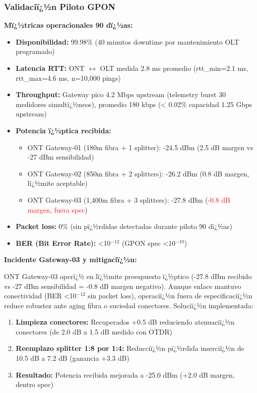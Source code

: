 \subsubsection{Validaciï¿½n Piloto GPON}

\textbf{Mï¿½tricas operacionales 90 dï¿½as:}

\begin{itemize}
    \item \textbf{Disponibilidad:} 99.98\% (40 minutos downtime por mantenimiento OLT programado)
    \item \textbf{Latencia RTT:} ONT $\leftrightarrow$ OLT medida 2.8 ms promedio (rtt\_min=2.1 ms, rtt\_max=4.6 ms, n=10,000 pings)
    \item \textbf{Throughput:} Gateway pico 4.2 Mbps upstream (telemetry burst 30 medidores simultï¿½neos), promedio 180 kbps (< 0.02\% capacidad 1.25 Gbps upstream)
    \item \textbf{Potencia ï¿½ptica recibida:} 
    \begin{itemize}
        \item ONT Gateway-01 (180m fibra + 1 splitter): -24.5 dBm (2.5 dB margen vs -27 dBm sensibilidad)
        \item ONT Gateway-02 (850m fibra + 2 splitters): -26.2 dBm (0.8 dB margen, lï¿½mite aceptable)
        \item ONT Gateway-03 (1,400m fibra + 3 splitters): -27.8 dBm (\textcolor{red}{-0.8 dB margen, fuera spec})
    \end{itemize}
    \item \textbf{Packet loss:} 0\% (sin pï¿½rdidas detectadas durante piloto 90 dï¿½as)
    \item \textbf{BER (Bit Error Rate):} <10$^{-12}$ (GPON spec <10$^{-10}$)
\end{itemize}

\textbf{Incidente Gateway-03 y mitigaciï¿½n:}

ONT Gateway-03 operï¿½ en lï¿½mite presupuesto ï¿½ptico (-27.8 dBm recibido vs -27 dBm sensibilidad = -0.8 dB margen negativo). Aunque enlace mantuvo conectividad (BER <10$^{-12}$ sin packet loss), operaciï¿½n fuera de especificaciï¿½n reduce robustez ante aging fibra o suciedad conectores. Soluciï¿½n implementada:

\begin{enumerate}
    \item \textbf{Limpieza conectores:} Recuperados +0.5 dB reduciendo atenuaciï¿½n conectores (de 2.0 dB a 1.5 dB medido con OTDR)
    \item \textbf{Reemplazo splitter 1:8 por 1:4:} Reducciï¿½n pï¿½rdida inserciï¿½n de 10.5 dB a 7.2 dB (ganancia +3.3 dB)
    \item \textbf{Resultado:} Potencia recibida mejorada a -25.0 dBm (+2.0 dB margen, dentro spec)
\end{enumerate}

